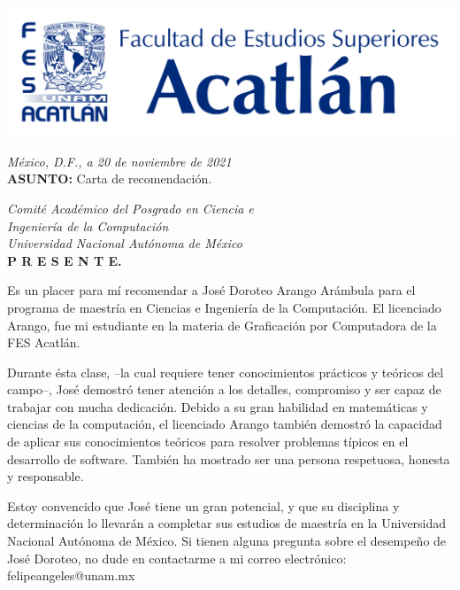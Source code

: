 \thispagestyle{empty}
\begin{large}
\begin{flushleft}
\includegraphics[scale=0.3]{img/logo-azul}
\end{flushleft}
\begin{flushright}
	\textit{México, D.F., a 20 de noviembre de 2021} \\
	\vspace{0.25cm}
	\textbf{ASUNTO:} Carta de recomendación.
\end{flushright}

\vspace{0.3cm}
\begin{flushleft}
	\textit{Comité Académico del Posgrado en Ciencia e\\Ingeniería de la Computación\\ 			Universidad Nacional Autónoma de México\\}
	\vspace{0.25cm}
	\textbf{P R E S E N T E.}
\end{flushleft}

\vspace{0.3cm}
Es un placer para mí recomendar a José Doroteo Arango Arámbula para el programa de maestría en Ciencias e Ingeniería de la Computación.
El licenciado Arango, fue mi estudiante en la materia de Graficación por Computadora de la FES Acatlán.

Durante ésta clase, –la cual requiere tener conocimientos prácticos y teóricos del campo–, José demostró tener atención a los detalles, compromiso y ser capaz de trabajar con mucha dedicación.
Debido a su gran habilidad en matemáticas y ciencias de la computación, el licenciado Arango también demostró la capacidad de aplicar sus conocimientos teóricos para resolver problemas típicos en el desarrollo de software.
También ha mostrado ser una persona respetuosa, honesta y responsable.

Estoy convencido que José tiene un gran potencial, y que su disciplina y determinación lo llevarán a completar sus estudios de maestría en la Universidad Nacional Autónoma de México.
Si tienen alguna pregunta sobre el desempeño de José Doroteo, no dude en contactarme a mi correo electrónico: felipeangeles@unam.mx


\end{large}
